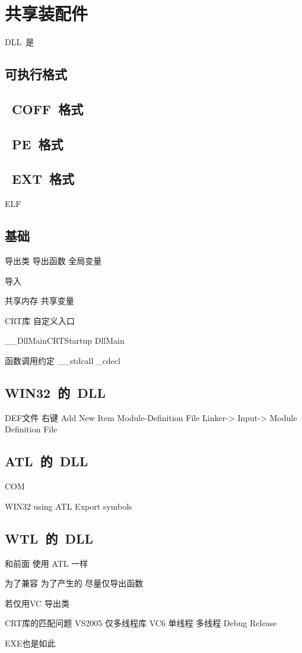 ﻿%
%

\chapter{共享装配件}\label{base:sa}

DLL~是

\section{可执行格式}

\section{~COFF~格式}

\section{~PE~格式}

\section{~EXT~格式}

ELF

\section{基础}

导出类 导出函数 全局变量

导入

共享内存 共享变量

CRT库 自定义入口

\_\_DllMainCRTStartup
DllMain

函数调用约定 \_\_stdcall \_cdecl

\section{WIN32~的~DLL}

DEF文件 右键 Add New Item Module-Definition File
Linker-> Input-> Module Definition File

\section{ATL~的~DLL}

COM

WIN32 using ATL
Export symbols

\section{WTL~的~DLL}

和前面
使用
ATL
一样

为了兼容 为了产生的
尽量仅导出函数

若仅用VC 导出类

CRT库的匹配问题
VS2005 仅多线程库
VC6 单线程 多线程
Debug Release

EXE也是如此
